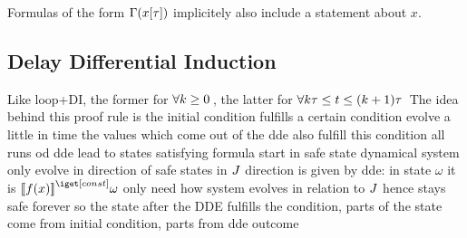 \documentclass[10pt]{report}
\begin{document}
        Formulas of the form $\Gamma(x[\tau])$ implicitely also include a statement about $x$.

    \subsection{Delay Differential Induction}
        \label{sec:delay-differential-induction}

        Like loop+DI, the former for $\lforall{k\geq 0}$, the latter for $\lforall{k\tau\leq t \leq (k+1)\tau}$
        The idea behind this proof rule is
        the initial condition fulfills a certain condition
        evolve a little in time
        the values which come out of the dde also fulfill this condition
        all runs od dde lead to states satisfying formula
        start in safe state
        dynamical system only evolve in direction of safe states in $J$
        direction is given by dde: in state $\omega$ it is $\imodel{}{f(x)}\omega$
        only need how system evolves in relation to $J$
        hence stays safe forever
        so the state after the DDE fulfills the condition, parts of the state come from initial condition, parts from dde outcome

        \begin{calculus}
        \end{calculus}
\end{document}
